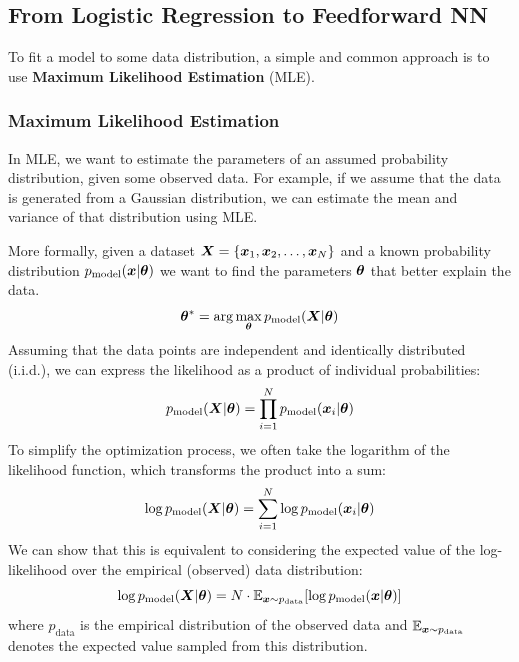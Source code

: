\subsection{From Logistic Regression to Feedforward NN}
To fit a model to some data distribution, a simple and common approach is to use \textbf{Maximum Likelihood Estimation} (MLE).

\subsubsection{Maximum Likelihood Estimation}
In MLE, we want to estimate the parameters of an assumed probability distribution, given some observed data. For example, if we assume that the data is generated from a Gaussian distribution, we can estimate the mean and variance of that distribution using MLE.

More formally, given a dataset $\boldsymbol{X} = \{\boldsymbol{x}_1, \boldsymbol{x}_2, \ldots, \boldsymbol{x}_N\}$ and a known probability distribution $p_{\text{model}}(\boldsymbol{x}|\boldsymbol{\theta})$
we want to find the parameters $\boldsymbol{\theta}$ that better explain the data.
\begin{equation}
    \label{MLE}
    \boldsymbol{\theta}^* = \arg\max_{\boldsymbol{\theta}} p_{\text{model}}(\boldsymbol{X}|\boldsymbol{\theta})
\end{equation}
Assuming that the data points are independent and identically distributed (i.i.d.), we can express the likelihood as a product of individual probabilities:
\begin{equation*}
    p_{\text{model}}(\boldsymbol{X}|\boldsymbol{\theta}) = \prod_{i=1}^{N} p_{\text{model}}(\boldsymbol{x}_i|\boldsymbol{\theta})
\end{equation*}
To simplify the optimization process, we often take the logarithm of the likelihood function, which transforms the product into a sum:
\begin{equation*}
    \log p_{\text{model}}(\boldsymbol{X}|\boldsymbol{\theta}) = \sum_{i=1}^{N} \log p_{\text{model}}(\boldsymbol{x}_i|\boldsymbol{\theta})
\end{equation*}
We can show that this is equivalent to considering the expected value of the log-likelihood over the empirical (observed) data distribution:
\begin{equation*}
    \log p_{\text{model}}(\boldsymbol{X}|\boldsymbol{\theta}) = N \cdot \mathbb{E}_{\boldsymbol{x} \sim p_{\text{data}}}[\log p_{\text{model}}(\boldsymbol{x}|\boldsymbol{\theta})]
\end{equation*}
where $p_{\text{data}}$ is the empirical distribution of the observed data and $\mathbb{E}_{\boldsymbol{x} \sim p_{\text{data}}}$ denotes the expected value sampled from this distribution.

